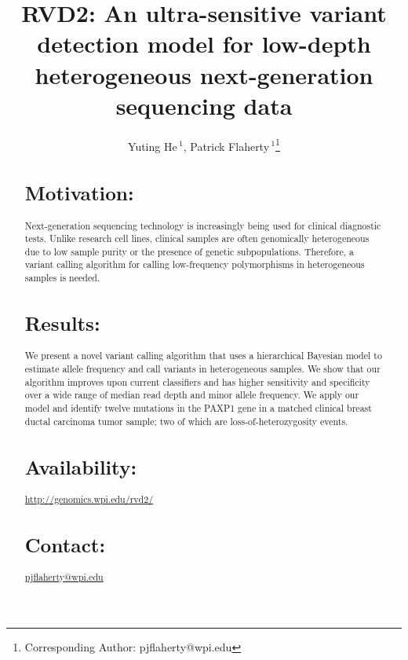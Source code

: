 \documentclass{bioinfo}
\begin{document}

\title[RVD2]{RVD2: An ultra-sensitive variant detection model for low-depth heterogeneous next-generation sequencing data}
\author[He \textit{et~al}]{Yuting He\,$^{1}$, Patrick Flaherty\,$^{1}$\footnote{Corresponding Author: pjflaherty@wpi.edu}}
\address{$^{1}$Department of Biomedical Engineering, Worcester Polytechnic Institute, Worcester, MA, USA}



\maketitle

\begin{abstract}

\section{Motivation:}Next-generation sequencing technology is increasingly being used for clinical diagnostic tests. Unlike research cell lines, clinical samples are often genomically heterogeneous due to low sample purity or the presence of genetic subpopulations. Therefore, a variant calling algorithm for calling low-frequency polymorphisms in heterogeneous samples is needed.

\section{Results:}We present a novel variant calling algorithm that uses a hierarchical Bayesian model to estimate allele frequency and call variants in heterogeneous samples. We show that our algorithm improves upon current classifiers and has higher sensitivity and specificity over a wide range of median read depth and minor allele frequency. We apply our model and identify twelve mutations in the PAXP1 gene in a matched clinical breast ductal carcinoma tumor sample; two of which are loss-of-heterozygosity events.


\section{Availability:}
\href{http://genomics.wpi.edu/rvd2/}{http://genomics.wpi.edu/rvd2/}

\section{Contact:} \href{pjflaherty@wpi.edu}{pjflaherty@wpi.edu}
\end{abstract}
\end{document}
